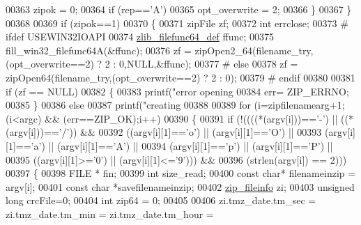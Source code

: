 \begin{DoxyCode}
{{{{{00363                     zipok = 0;
00364                 \textcolor{keywordflow}{if} (rep==\textcolor{charliteral}{'A'})
00365                     opt\_overwrite = 2;
00366             \}
00367     \}
00368 
00369     \textcolor{keywordflow}{if} (zipok==1)
00370     \{
00371         zipFile zf;
00372         \textcolor{keywordtype}{int} errclose;
00373 \textcolor{preprocessor}{#        ifdef USEWIN32IOAPI}
00374         \hyperlink{structzlib__filefunc64__def__s}{zlib\_filefunc64\_def} ffunc;
00375         fill\_win32\_filefunc64A(&ffunc);
00376         zf = zipOpen2\_64(filename\_try,(opt\_overwrite==2) ? 2 : 0,NULL,&ffunc);
00377 \textcolor{preprocessor}{#        else}
00378         zf = zipOpen64(filename\_try,(opt\_overwrite==2) ? 2 : 0);
00379 \textcolor{preprocessor}{#        endif}
00380 
00381         \textcolor{keywordflow}{if} (zf == NULL)
00382         \{
00383             printf(\textcolor{stringliteral}{"error opening %
00384             err= ZIP\_ERRNO;
00385         \}
00386         \textcolor{keywordflow}{else}
00387             printf(\textcolor{stringliteral}{"creating %
00388 
00389         \textcolor{keywordflow}{for} (i=zipfilenamearg+1;(i<argc) && (err==ZIP\_OK);i++)
00390         \{
00391             \textcolor{keywordflow}{if} (!((((*(argv[i]))==\textcolor{charliteral}{'-'}) || ((*(argv[i]))==\textcolor{charliteral}{'/'})) &&
00392                   ((argv[i][1]==\textcolor{charliteral}{'o'}) || (argv[i][1]==\textcolor{charliteral}{'O'}) ||
00393                    (argv[i][1]==\textcolor{charliteral}{'a'}) || (argv[i][1]==\textcolor{charliteral}{'A'}) ||
00394                    (argv[i][1]==\textcolor{charliteral}{'p'}) || (argv[i][1]==\textcolor{charliteral}{'P'}) ||
00395                    ((argv[i][1]>=\textcolor{charliteral}{'0'}) || (argv[i][1]<=\textcolor{charliteral}{'9'}))) &&
00396                   (strlen(argv[i]) == 2)))
00397             \{
00398                 FILE * fin;
00399                 \textcolor{keywordtype}{int} size\_read;
00400                 \textcolor{keyword}{const} \textcolor{keywordtype}{char}* filenameinzip = argv[i];
00401                 \textcolor{keyword}{const} \textcolor{keywordtype}{char} *savefilenameinzip;
00402                 \hyperlink{structzip__fileinfo}{zip\_fileinfo} zi;
00403                 \textcolor{keywordtype}{unsigned} \textcolor{keywordtype}{long} crcFile=0;
00404                 \textcolor{keywordtype}{int} zip64 = 0;
00405 
00406                 zi.tmz\_date.tm\_sec = zi.tmz\_date.tm\_min = zi.tmz\_date.tm\_hour =
}}}}}}}
\end{DoxyCode}
